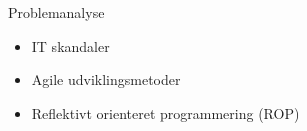 \begin{frame}{Problemanalyse}
	\begin{itemize}
		\item IT skandaler
		\item Agile udviklingsmetoder
		\item Reflektivt orienteret programmering (ROP)
	\end{itemize}

\end{frame}